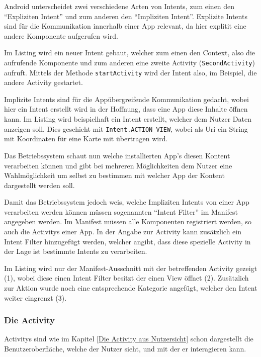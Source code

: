Android unterscheidet zwei verschiedene Arten von Intents, zum einen den "`Expliziten Intent"' und zum anderen den "`Impliziten Intent"'. Explizite Intents sind f\"ur die Kommunikation innerhalb einer App relevant, da hier explitit eine andere Komponente aufgerufen wird. 

Im Listing wird ein neuer Intent gebaut, welcher zum einen den Context, also die aufrufende Komponente und zum anderen eine zweite Activity (\texttt{SecondActivity}) aufruft. Mittels der Methode \texttt{startActivity} wird der Intent also, im Beispiel, die andere Activity gestartet.



Implizite Intents sind f\"ur die App\"ubergreifende Kommunikation gedacht, wobei hier ein Intent erstellt wird in der Hoffnung, dass eine App diese Inhalte \"offnen kann.
Im Listing wird beispielhaft ein Intent erstellt, welcher dem Nutzer Daten anzeigen soll. Dies geschieht mit \texttt{Intent.ACTION\_VIEW}, wobei als Uri ein String mit Koordinaten f\"ur eine Karte mit \"ubertragen wird.



Das Betriebssystem schaut nun welche installierten App's diesen Kontent verarbeiten k\"onnen und gibt bei mehreren M\"oglichkeiten dem Nutzer eine Wahlm\"oglichkeit um selbst zu bestimmen mit welcher App der Kontent dargestellt werden soll.

Damit das Betriebssystem jedoch weis, welche Impliziten Intents von einer App verarbeiten werden k\"onnen m\"ussen sogenannten "`Intent Filter"' im Manifest angegeben werden.
Im Manifest m\"ussen alle Komponenten registriert werden, so auch die Activitys einer App. In der Angabe zur Activity kann zus\"atzlich ein Intent Filter hinzugef\"ugt werden, welcher angibt, dass diese spezielle Activity in der Lage ist bestimmte Intents zu verarbeiten.

Im Listing wird nur der Manifest-Ausschnitt mit der betreffenden Activity gezeigt (1), wobei diese einen Intent Filter besitzt der einen View \"offnet (2). Zus\"atzlich zur Aktion wurde noch eine entsprechende Kategorie angef\"ugt, welcher den Intent weiter eingrenzt (3). \cite{VogellaIntent}



\subsubsection{Die Activity} \label{Die Activity aus Programmierersicht}
Activitys sind wie im Kapitel \ref{Die Activity aus Nutzersicht} schon dargestellt die Benutzeroberfl\"ache, welche der Nutzer sieht, und mit der er interagieren kann.

